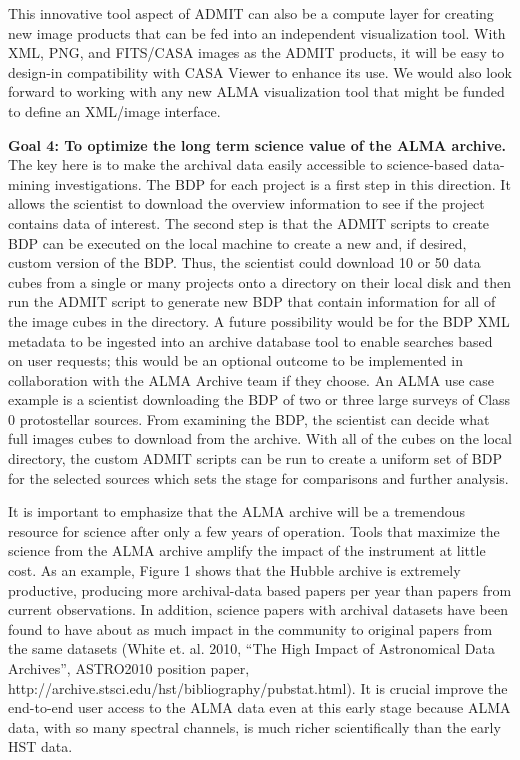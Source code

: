This innovative tool aspect of ADMIT can also be a compute layer for creating new image 
products that can be fed into an independent visualization tool. With XML, PNG, and 
FITS/CASA images as the ADMIT products, it will be easy to design-in 
compatibility with CASA Viewer to enhance its use. We would also look forward to 
working with any new ALMA visualization tool that might be funded to define an XML/image interface.

\noindent
{\bf Goal 4: To optimize the long term science value of the ALMA archive. }  The
key here is to make the archival data easily accessible to science-based data-mining 
investigations. The BDP for each project is a first step in this direction. It allows the 
scientist to download the overview information to see if the project contains data 
of interest. The second step is that the ADMIT scripts to create BDP can be executed 
on the local machine to create a new and, if desired, custom version of the BDP.  
Thus, the scientist could download 10 or 50 data cubes from a single or many projects 
onto a directory on their local disk and then run the ADMIT script to generate new BDP 
that contain information for all of the image cubes in the directory. A future possibility 
would be for the BDP XML metadata to be ingested into an archive database tool to enable 
searches based on user requests; this would be an optional outcome to be implemented in 
collaboration with the ALMA Archive team if they choose.  An ALMA use case example is 
a scientist downloading the BDP of two or three large surveys of Class 0 protostellar 
sources. From examining the BDP, the scientist can decide what full images cubes 
to download from the archive. With all of the cubes on the local directory, the 
custom ADMIT scripts can be run to create a uniform set of BDP for the selected 
sources which sets the stage for comparisons and further analysis.

It is important to emphasize that the ALMA archive will be a tremendous resource for 
science after only a few years of operation. Tools that maximize the science from the 
ALMA archive amplify the impact of the instrument at little cost.  
As an example, Figure 1 shows that the Hubble archive is extremely productive, 
producing more archival-data based papers per year than papers from current 
observations. In addition, science papers with archival datasets have been found 
to have about as much impact in the community to original papers from the same 
datasets (White et. al. 2010, ``The High Impact of Astronomical Data Archives'', 
ASTRO2010 position paper, http://archive.stsci.edu/hst/bibliography/pubstat.html).
It is crucial improve the end-to-end user access to the 
ALMA data even at this early stage because ALMA data, with so many spectral 
channels, is much richer scientifically than the early HST data.

